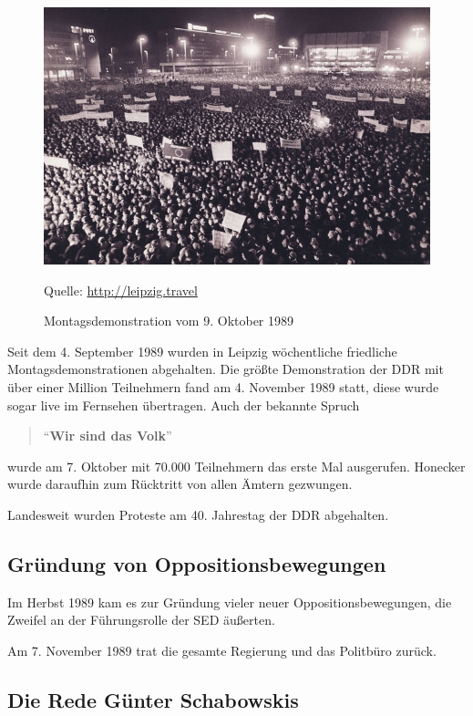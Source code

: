 \documentclass[12pt,a4paper]{article}
\begin{document}
\begin{figure}[hbp]
    \centering
    \includegraphics[width=\textwidth]{Bilder/montagsdemo.jpg}
    \caption{Montagsdemonstration vom 9. Oktober 1989}
    Quelle: \url{http://leipzig.travel}
    \label{img:demo}
\end{figure}

Seit dem 4. September 1989 wurden in Leipzig wöchentliche friedliche Montagsdemonstrationen abgehalten. Die größte Demonstration der DDR mit über einer Million Teilnehmern fand am 4. November 1989 statt, diese wurde sogar live im Fernsehen übertragen. Auch der bekannte Spruch

\begin{quotation}
    \enquote{\bf Wir sind das Volk}
\end{quotation}

wurde am 7. Oktober mit 70.000 Teilnehmern das erste Mal ausgerufen. Honecker wurde daraufhin zum Rücktritt von allen Ämtern gezwungen. 

Landesweit wurden Proteste am 40. Jahrestag der DDR abgehalten.


\subsection{Gründung von Oppositionsbewegungen}

Im Herbst 1989 kam es zur Gründung vieler neuer Oppositionsbewegungen, die Zweifel an der Führungsrolle der SED äußerten.

Am 7. November 1989 trat die gesamte Regierung und das Politbüro zurück.


\subsection{Die Rede Günter Schabowskis}
\end{document}
